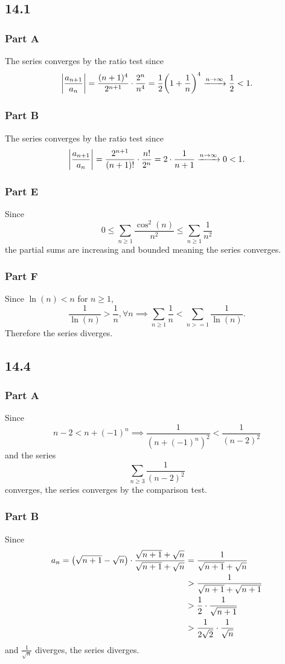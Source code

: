 \documentclass[12pt,titlepage]{extarticle}
\begin{document}
\subsection*{14.1}
\subsubsection*{Part A}
The series converges by the ratio test since
\[
    \qty|\frac{a_{n+1}}{a_n}| = \frac{(n+1)^4}{2^{n+1}} \cdot \frac{2^n}{n^4} = \frac{1}{2} \qty(1 + \frac{1}{n})^4 \xrightarrow{n \to \infty} \frac{1}{2} < 1
.\]

\subsubsection*{Part B}
The series converges by the ratio test since
\[
    \qty|\frac{a_{n+1}}{a_n}| = \frac{2^{n+1}}{(n+1)!} \cdot \frac{n!}{2^n} = 2 \cdot \frac{1}{n+1} \xrightarrow{n \to \infty} 0 < 1
.\]

\subsubsection*{Part E}
Since
\[
    0 \leq \sum_{n \geq 1} \frac{\cos^2(n)}{n^2} \leq \sum_{n \geq 1} \frac{1}{n^2}
\]
the partial sums are increasing and bounded meaning the series converges.

\subsubsection*{Part F}
Since $\ln(n) < n$ for $n \geq 1$,
\[
    \frac{1}{\ln(n)} > \frac{1}{n}, \forall n \implies \sum_{n \geq 1} \frac{1}{n} < \sum_{n>= 1} \frac{1}{\ln(n)}
.\]
Therefore the series diverges.

\subsection*{14.4}
\subsubsection*{Part A}
Since
\[
    n - 2 < n + (-1)^n \implies \frac{1}{(n + (-1)^n)^2} < \frac{1}{(n-2)^2}
\]
and the series
\[
    \sum_{n \geq 3} \frac{1}{(n-2)^2}
\]
converges, the series converges by the comparison test.

\subsubsection*{Part B}
Since
\begin{align*}
    a_n = \qty(\sqrt{n+1} - \sqrt{n}) \cdot \frac{\sqrt{n+1} + \sqrt{n}}{\sqrt{n+1} + \sqrt{n}} &= \frac{1}{\sqrt{n+1} + \sqrt{n}} \\
    &> \frac{1}{\sqrt{n+1} + \sqrt{n+1}} \\
    &> \frac{1}{2} \cdot \frac{1}{\sqrt{n+1}} \\
    & > \frac{1}{2\sqrt{2}} \cdot \frac{1}{\sqrt{n}}
\end{align*}
and $\frac{1}{\sqrt{n}}$ diverges, the series diverges.
\end{document}
